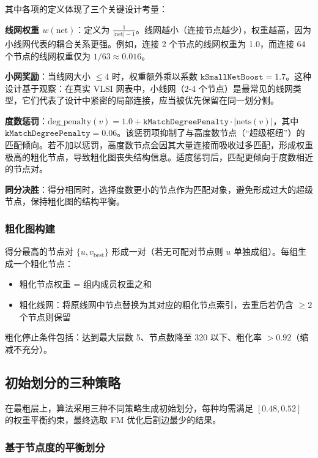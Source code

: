 \documentclass[journal, twocolumn]{IEEEtran}
\begin{document}
其中各项的定义体现了三个关键设计考量：

\textbf{线网权重 $w(\text{net})$}：定义为 $\frac{1}{|\text{net}| - 1}$。线网越小（连接节点越少），权重越高，因为小线网代表的耦合关系更强。例如，连接 2 个节点的线网权重为 1.0，而连接 64 个节点的线网权重仅为 $1/63 \approx 0.016$。

\textbf{小网奖励}：当线网大小 $\le 4$ 时，权重额外乘以系数 $\texttt{kSmallNetBoost} = 1.7$。这种设计基于观察：在真实 VLSI 网表中，小线网（2-4 个节点）是最常见的线网类型，它们代表了设计中紧密的局部连接，应当被优先保留在同一划分侧。

\textbf{度数惩罚}：$\text{deg\_penalty}(v) = 1.0 + \texttt{kMatchDegreePenalty} \cdot |\text{nets}(v)|$，其中 $\texttt{kMatchDegreePenalty} = 0.06$。该惩罚项抑制了与高度数节点（“超级枢纽”）的匹配倾向。若不加以惩罚，高度数节点会因其大量连接而吸收过多匹配，形成权重极高的粗化节点，导致粗化图丧失结构信息。适度惩罚后，匹配更倾向于度数相近的节点对。

\textbf{同分决胜}：得分相同时，选择度数更小的节点作为匹配对象，避免形成过大的超级节点，保持粗化图的结构平衡。

\subsubsection{粗化图构建}

得分最高的节点对 $\{u, v_{\text{best}}\}$ 形成一对（若无可配对节点则 $u$ 单独成组）。每组生成一个粗化节点：
\begin{itemize}
    \item 粗化节点权重 = 组内成员权重之和
    \item 粗化线网：将原线网中节点替换为其对应的粗化节点索引，去重后若仍含 $\ge 2$ 个节点则保留
\end{itemize}

粗化停止条件包括：达到最大层数 5、节点数降至 320 以下、粗化率 $> 0.92$（缩减不充分）。

\subsection{初始划分的三种策略}

在最粗层上，算法采用三种不同策略生成初始划分，每种均需满足 $[0.48, 0.52]$ 的权重平衡约束，最终选取 FM 优化后割边最少的结果。

\subsubsection{基于节点度的平衡划分}
\end{document}
